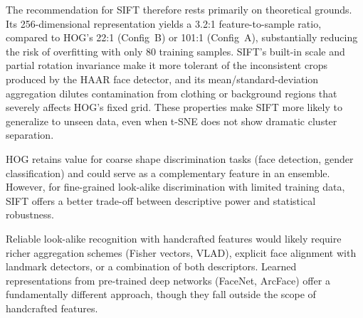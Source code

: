 \documentclass[a4paper,10pt]{article}
\begin{document}
The recommendation for SIFT therefore rests primarily on theoretical grounds.
Its 256-dimensional representation yields a 3.2:1 feature-to-sample ratio, compared to HOG's 22:1 (Config~B) or 101:1 (Config~A), substantially reducing the risk of overfitting with only 80 training samples.
SIFT's built-in scale and partial rotation invariance make it more tolerant of the inconsistent crops produced by the HAAR face detector, and its mean/standard-deviation aggregation dilutes contamination from clothing or background regions that severely affects HOG's fixed grid.
These properties make SIFT more likely to generalize to unseen data, even when t-SNE does not show dramatic cluster separation.

HOG retains value for coarse shape discrimination tasks (face detection, gender classification) and could serve as a complementary feature in an ensemble.
However, for fine-grained look-alike discrimination with limited training data, SIFT offers a better trade-off between descriptive power and statistical robustness.

Reliable look-alike recognition with handcrafted features would likely require richer aggregation schemes (Fisher vectors, VLAD), explicit face alignment with landmark detectors, or a combination of both descriptors.
Learned representations from pre-trained deep networks (FaceNet, ArcFace) offer a fundamentally different approach, though they fall outside the scope of handcrafted features.
\end{document}
